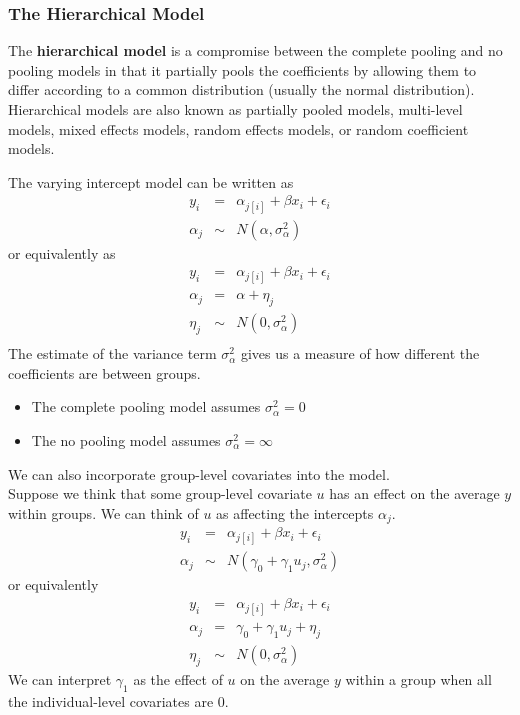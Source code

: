 \documentclass[handout]{beamer}
\begin{document}
\begin{frame}
\frametitle{The Hierarchical Model}
\pause
The \textbf{hierarchical model} is a compromise between the complete pooling
and no pooling models in that it partially pools the coefficients by
allowing them to differ according to a common distribution (usually
the normal distribution). \\
\bigskip
\pause
Hierarchical models are also known as partially pooled models, \pause
multi-level models, \pause mixed effects models, \pause random effects
models, or \pause random coefficient models.
\end{frame}

\begin{frame}
The varying intercept model can be written as 
\begin{eqnarray*}
y_i &=& \alpha_{j[i]} + \beta x_i + \epsilon_i \\
\alpha_j &\sim& N(\alpha, \sigma^2_{\alpha})
\end{eqnarray*}
\pause
or equivalently as
\begin{eqnarray*}
y_i &=& \alpha_{j[i]} + \beta x_i + \epsilon_i \\
\alpha_j &=& \alpha + \eta_j \\
\eta_j &\sim& N(0, \sigma^2_{\alpha})\\
\end{eqnarray*}
\pause
The estimate of the variance term $\sigma^2_{\alpha}$ gives us a
measure of how different the coefficients are between groups.
\pause
\begin{itemize}
\item The complete pooling model assumes $\sigma^2_{\alpha} = 0$ 
\pause
\item The no pooling model assumes $\sigma^2_{\alpha} = \infty$ 
\end{itemize}
\end{frame}

\begin{frame}
We can also incorporate group-level covariates into the model. \\
\pause
\bigskip
Suppose we think that some group-level covariate $u$ has an effect on
the average $y$ within groups.  \pause We can think of $u$ as
affecting the intercepts $\alpha_j$.
\pause
\begin{eqnarray*}
y_i &=& \alpha_{j[i]} + \beta x_i + \epsilon_i \\
\alpha_j &\sim& N(\gamma_0 + \gamma_1 u_j, \sigma^2_{\alpha})
\end{eqnarray*}
\pause
or equivalently 
\begin{eqnarray*}
y_i &=& \alpha_{j[i]} + \beta x_i + \epsilon_i \\
\alpha_j &=& \gamma_0 + \gamma_1 u_j + \eta_j \\
\eta_j &\sim& N(0, \sigma^2_{\alpha})
\end{eqnarray*}
\pause
We can interpret $\gamma_1$ as the effect of $u$ on the average $y$
within a group when all the individual-level covariates are 0.
\end{frame}
\end{document}
